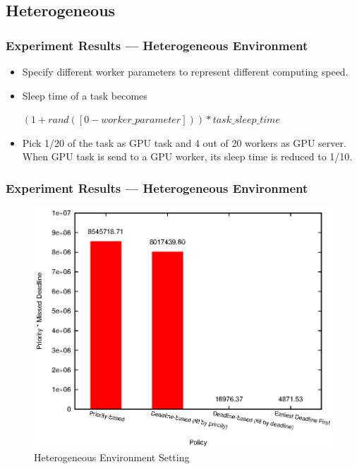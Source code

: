 \subsection{Heterogeneous}
\begin{frame}
  \frametitle{Experiment Results --- Heterogeneous Environment}
  \begin{itemize}
    \item Specify different worker parameters to represent different
      computing speed.
    \item Sleep time of a task becomes
      \begin{center}
        \begin{minipage}{.8\textwidth}
          \begin{exampleblock}{}
            \centering
            $\left(1 + rand([0-worker\_parameter])\right)*task\_sleep\_time$
          \end{exampleblock}
        \end{minipage}
      \end{center}
    \item Pick 1/20 of the task as GPU task and 4 out of 20 workers as
      GPU server.  When GPU task is send to a GPU worker, its sleep
      time is reduced to 1/10.
  \end{itemize}
\end{frame}

\begin{frame}
  \frametitle{Experiment Results --- Heterogeneous Environment}
  \begin{figure}[htbp]
    \centering
    \includegraphics[width=\textwidth,height=0.7\textheight,keepaspectratio]{figures/hetero.eps}
    \caption{Heterogeneous Environment Setting}
    \label{fig:hetero-exp}
  \end{figure}
\end{frame}

